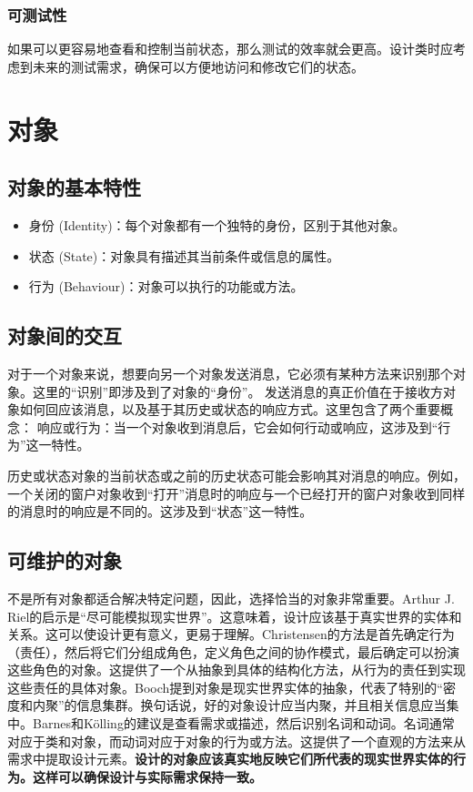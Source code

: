 \documentclass[]{ctexbook}
\begin{document}
\subsubsection{可测试性}
如果可以更容易地查看和控制当前状态，那么测试的效率就会更高。设计类时应考虑到未来的测试需求，确保可以方便地访问和修改它们的状态。

\section{对象}
\subsection{对象的基本特性}
\begin{itemize}
    \item 身份 (Identity)：每个对象都有一个独特的身份，区别于其他对象。
    \item 状态 (State)：对象具有描述其当前条件或信息的属性。
    \item 行为 (Behaviour)：对象可以执行的功能或方法。
\end{itemize}

\subsection{对象间的交互}
对于一个对象来说，想要向另一个对象发送消息，它必须有某种方法来识别那个对象。这里的“识别”即涉及到了对象的“身份”。
发送消息的真正价值在于接收方对象如何回应该消息，以及基于其历史或状态的响应方式。这里包含了两个重要概念：
响应或行为：当一个对象收到消息后，它会如何行动或响应，这涉及到“行为”这一特性。

历史或状态对象的当前状态或之前的历史状态可能会影响其对消息的响应。例如，一个关闭的窗户对象收到“打开”消息时的响应与一个已经打开的窗户对象收到同样的消息时的响应是不同的。这涉及到“状态”这一特性。

\subsection{可维护的对象}
不是所有对象都适合解决特定问题，因此，选择恰当的对象非常重要。Arthur J. Riel的启示是“尽可能模拟现实世界”。这意味着，设计应该基于真实世界的实体和关系。这可以使设计更有意义，更易于理解。Christensen的方法是首先确定行为（责任），然后将它们分组成角色，定义角色之间的协作模式，最后确定可以扮演这些角色的对象。这提供了一个从抽象到具体的结构化方法，从行为的责任到实现这些责任的具体对象。Booch提到对象是现实世界实体的抽象，代表了特别的“密度和内聚”的信息集群。换句话说，好的对象设计应当内聚，并且相关信息应当集中。Barnes和Kölling的建议是查看需求或描述，然后识别名词和动词。名词通常对应于类和对象，而动词对应于对象的行为或方法。这提供了一个直观的方法来从需求中提取设计元素。\textbf{设计的对象应该真实地反映它们所代表的现实世界实体的行为。这样可以确保设计与实际需求保持一致。}
\end{document}
